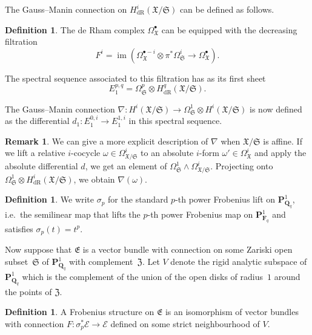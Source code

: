 \documentclass[a4paper,11pt]{article}
\numberwithin{equation}{section}
\newcommand{\QQ}{\mathbf{Q}} %
\newcommand{\FF}{\mathbf{F}} %
\DeclareMathOperator{\fIm}{im}       %
\providecommand{\HdR}{H_{\text{dR}}}    %
\theoremstyle{definition}
\newtheorem{defn}[thm]{Definition}
\newtheorem{rem}[thm]{Remark}
\begin{document}
The Gauss--Manin connection on $\HdR^i(\mathfrak{X}/\mathfrak{S})$ can be defined as follows.

\begin{defn}
The de Rham complex $\Omega^{\bullet}_{\mathfrak{X}}$ can be equipped with the decreasing
filtration
\[
F^i=\fIm(\Omega^{\bullet-i}_{\mathfrak{X}} \otimes \pi^* \Omega^i_{\mathfrak{S}} \rightarrow \Omega^{\bullet}_{\mathfrak{X}}). 
\]

The spectral sequence associated to this filtration has as its first sheet
\[
E_1^{p,q}=\Omega^p_{\mathfrak{S}} \otimes \HdR^q(\mathfrak{X}/\mathfrak{S}).
\]

The Gauss--Manin connection 
$\nabla:H^i(\mathfrak{X}/\mathfrak{S}) \rightarrow \Omega^1_{\mathfrak{S}} \otimes H^i(\mathfrak{X}/\mathfrak{S})$ 
is now defined as the differential $d_1: E_1^{0,i} \rightarrow E_1^{1,i}$ in this spectral sequence.
\end{defn}

\begin{rem}
We can give a more explicit description of $\nabla$ when $\mathfrak{X}/\mathfrak{S}$ is affine. If we lift a 
relative $i$-cocycle $\omega \in \Omega^i_{\mathfrak{X}/\mathfrak{S}}$ to an absolute $i$-form 
$\omega' \in \Omega^i_{\mathfrak{X}}$ and apply the absolute differential $d$, we get an element of 
$\Omega^1_{\mathfrak{S}} \wedge \Omega^i_{\mathfrak{X}/\mathfrak{S}}$. Projecting onto 
$\Omega^1_{\mathfrak{S}} \otimes \HdR^i(\mathfrak{X}/\mathfrak{S})$, we obtain $\nabla(\omega)$. 
\end{rem}

\begin{defn}
We write $\sigma_p$ for the standard $p$-th power Frobenius lift on $\mathbf{P}^1_{\QQ_q}$, i.e.\ 
the semilinear map that lifts the $p$-th power Frobenius map on $\mathbf{P}^1_{\FF_q}$ and
satisfies $\sigma_p(t)=t^p$. 
\end{defn}

Now suppose that $\mathfrak{E}$ is a vector bundle with connection on 
some Zariski open subset~$\mathfrak{S}$ of $\mathbf{P}^1_{\QQ_q}$ with 
complement~$\mathfrak{Z}$. Let $V$ denote the rigid analytic subspace 
of $\mathbf{P}^1_{\QQ_q}$ which is the complement of the union of the 
open disks of radius~$1$ around the points of $\mathfrak{Z}$.

\begin{defn}
A Frobenius structure on $\mathfrak{E}$ is an isomorphism of vector bundles with connection 
$F:\sigma_p^* \mathcal{E} \rightarrow \mathcal{E}$ defined on some strict neighbourhood of $V$. 
\end{defn}
\end{document}
